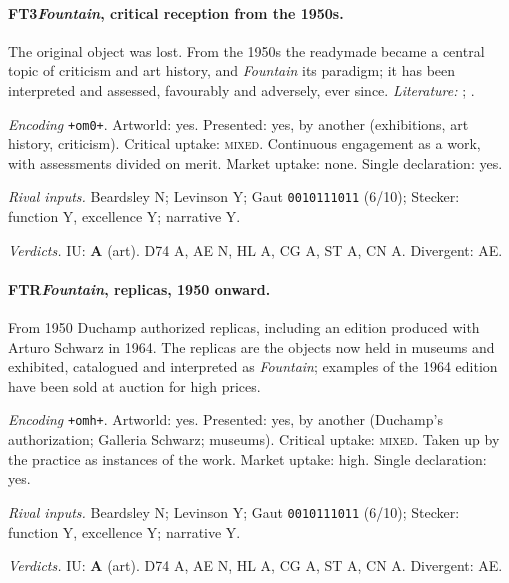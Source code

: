 \paragraph{FT3\enspace \emph{Fountain}, critical reception from the 1950s.}
The original object was lost. From the 1950s the readymade became a central topic of criticism and art history, and \emph{Fountain} its paradigm; it has been interpreted and assessed, favourably and adversely, ever since. \textit{Literature:} \citet{deDuve1996}; \citet{Danto1981}.\par
\noindent\textit{Encoding} \texttt{+om0+}. Artworld: yes. Presented: yes, by another (exhibitions, art history, criticism). Critical uptake: \textsc{mixed}. Continuous engagement as a work, with assessments divided on merit. Market uptake: none. Single declaration: yes.\par
\noindent\textit{Rival inputs.} Beardsley N; Levinson Y; Gaut \texttt{0010111011} (6/10); Stecker: function Y, excellence Y; narrative Y.\par
\noindent\textit{Verdicts.} IU: \textbf{A} (art). D74 A, AE N, HL A, CG A, ST A, CN A. Divergent: AE.\par

\paragraph{FTR\enspace \emph{Fountain}, replicas, 1950 onward.}
From 1950 Duchamp authorized replicas, including an edition produced with Arturo Schwarz in 1964. The replicas are the objects now held in museums and exhibited, catalogued and interpreted as \emph{Fountain}; examples of the 1964 edition have been sold at auction for high prices.\par
\noindent\textit{Encoding} \texttt{+omh+}. Artworld: yes. Presented: yes, by another (Duchamp's authorization; Galleria Schwarz; museums). Critical uptake: \textsc{mixed}. Taken up by the practice as instances of the work. Market uptake: high. Single declaration: yes.\par
\noindent\textit{Rival inputs.} Beardsley N; Levinson Y; Gaut \texttt{0010111011} (6/10); Stecker: function Y, excellence Y; narrative Y.\par
\noindent\textit{Verdicts.} IU: \textbf{A} (art). D74 A, AE N, HL A, CG A, ST A, CN A. Divergent: AE.\par

